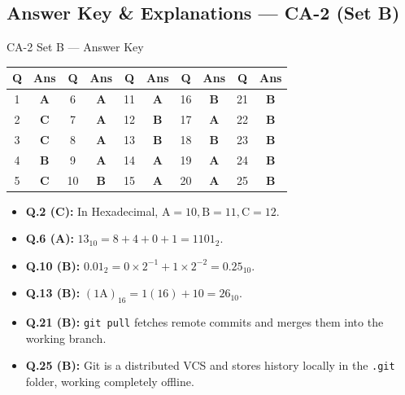 
\newpage
\subsection*{Answer Key \& Explanations --- CA-2 (Set B)}

\begin{answerkeytable}{CA-2 Set B --- Answer Key}
\begin{tabular}{*{10}{c}}
\toprule
\textbf{Q} & \textbf{Ans} & \textbf{Q} & \textbf{Ans} & \textbf{Q} & \textbf{Ans} & \textbf{Q} & \textbf{Ans} & \textbf{Q} & \textbf{Ans} \\
\midrule
1 & \textbf{A} & 6 & \textbf{A} & 11 & \textbf{A} & 16 & \textbf{B} & 21 & \textbf{B} \\
2 & \textbf{C} & 7 & \textbf{A} & 12 & \textbf{B} & 17 & \textbf{A} & 22 & \textbf{B} \\
3 & \textbf{C} & 8 & \textbf{A} & 13 & \textbf{B} & 18 & \textbf{B} & 23 & \textbf{B} \\
4 & \textbf{B} & 9 & \textbf{A} & 14 & \textbf{A} & 19 & \textbf{A} & 24 & \textbf{B} \\
5 & \textbf{C} & 10 & \textbf{B} & 15 & \textbf{A} & 20 & \textbf{A} & 25 & \textbf{B} \\
\bottomrule
\end{tabular}
\end{answerkeytable}

\begin{expbox}
\begin{itemize}[leftmargin=5mm]
    \item \textbf{Q.2 (C):} In Hexadecimal, $\text{A}=10, \text{B}=11, \text{C}=12$.
    \item \textbf{Q.6 (A):} $13_{10} = 8 + 4 + 0 + 1 = 1101_2$.
    \item \textbf{Q.10 (B):} $0.01_2 = 0 \times 2^{-1} + 1 \times 2^{-2} = 0.25_{10}$.
    \item \textbf{Q.13 (B):} $(1\text{A})_{16} = 1(16) + 10 = 26_{10}$.
    \item \textbf{Q.21 (B):} \texttt{git pull} fetches remote commits and merges them into the working branch.
    \item \textbf{Q.25 (B):} Git is a distributed VCS and stores history locally in the \texttt{.git} folder, working completely offline.
\end{itemize}
\end{expbox}

\newpage
